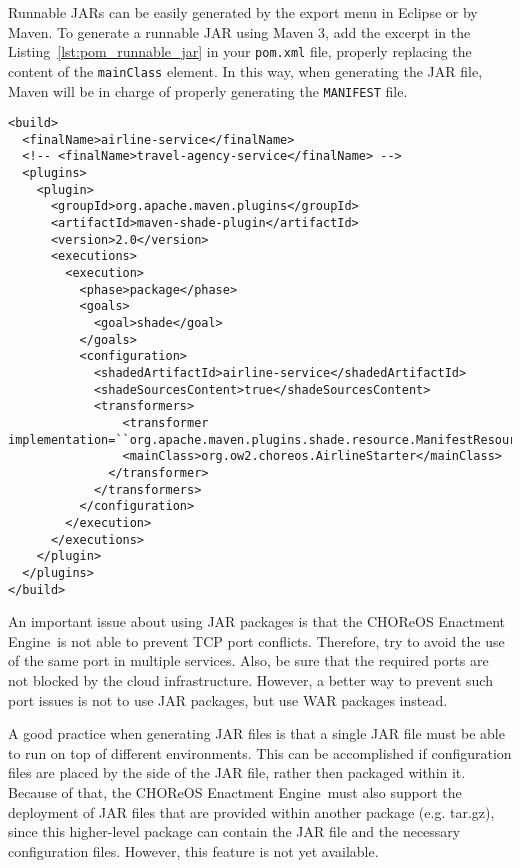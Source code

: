 \documentclass[a4paper, 10pt]{article}
\newcommand{\ee}{CHOReOS Enactment Engine}
\begin{document}
Runnable JARs can be easily generated by the export menu in Eclipse or by Maven. To generate a runnable JAR using Maven 3, add the excerpt in the Listing~\ref{lst:pom_runnable_jar} in your \texttt{pom.xml} file, properly replacing the content of the \texttt{mainClass} element. In this way, when generating the JAR file, Maven will be in charge of properly generating the \texttt{MANIFEST} file.

\lstset{
language=XML
}

{\footnotesize
\begin{lstlisting}[caption=Excerpt of pom file to generate a runnable JAR using Maven 3, label=lst:pom_runnable_jar]
<build>
  <finalName>airline-service</finalName> 
  <!-- <finalName>travel-agency-service</finalName> -->
  <plugins>
    <plugin>
      <groupId>org.apache.maven.plugins</groupId>
      <artifactId>maven-shade-plugin</artifactId>
      <version>2.0</version>
      <executions>
        <execution>
          <phase>package</phase>
          <goals>
            <goal>shade</goal>
          </goals>
          <configuration>
            <shadedArtifactId>airline-service</shadedArtifactId>
            <shadeSourcesContent>true</shadeSourcesContent>
            <transformers>
                <transformer 
implementation=``org.apache.maven.plugins.shade.resource.ManifestResourceTransformer''>
                <mainClass>org.ow2.choreos.AirlineStarter</mainClass>
              </transformer>
            </transformers>
          </configuration>
        </execution>
      </executions>
    </plugin>
  </plugins>
</build>
\end{lstlisting}
}

An important issue about using JAR packages is that the \ee\ is not able to prevent TCP port conflicts. Therefore, try to avoid the use of the same port in multiple services. Also, be sure that the required ports are not blocked by the cloud infrastructure. However, a better way to prevent such port issues is not to use JAR packages, but use WAR packages instead.

A good practice when generating JAR files is that a single JAR file must be able to run on top of different environments. This can be accomplished if configuration files are placed by the side of the JAR file, rather then packaged within it. Because of that, the \ee\ must also support the deployment of JAR files that are provided within another package (e.g. tar.gz), since this higher-level package can contain the JAR file and the necessary configuration files. However, this feature is not yet available.
\end{document}
